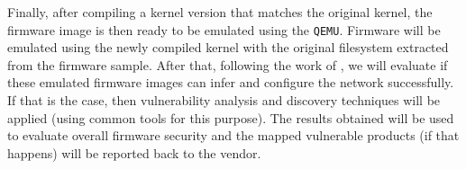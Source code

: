 Finally, after compiling a kernel version that matches the original kernel, the firmware image is then ready to be emulated using the {\tt QEMU}. Firmware will be emulated using the newly compiled kernel with the original filesystem extracted from the firmware sample. After that, following the work of \cite{firmadyne}, we will evaluate if these emulated firmware images can infer and configure the network successfully. If that is the case, then vulnerability analysis and discovery techniques will be applied (using common tools for this purpose). The results obtained will be used to evaluate overall firmware security and the mapped vulnerable products (if that happens) will be reported back to the vendor.